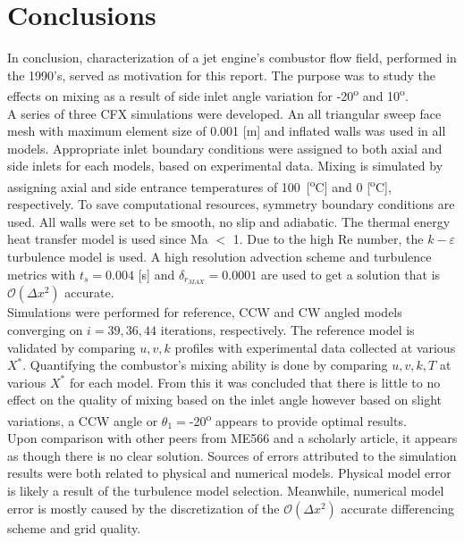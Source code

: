 \chapter{Conclusions}
\label{ch:conc}

In conclusion, characterization of a jet engine's combustor flow field, performed in the 1990's, served as motivation for this report. The purpose was to study the effects on mixing as a result of side inlet angle variation for -20\textsuperscript{o} and 10\textsuperscript{o}.\\

A series of three CFX simulations were developed. An all triangular sweep face mesh with maximum element size of 0.001 [m] and inflated walls was used in all models. Appropriate inlet boundary conditions were assigned to both axial and side inlets for each models, based on experimental data. Mixing is simulated by assigning  axial and side entrance temperatures of 100~[\textsuperscript{o}C] and 0 [\textsuperscript{o}C], respectively. To save computational resources, symmetry boundary conditions are used. All walls were set to be smooth, no slip and adiabatic. The thermal energy heat transfer model is used since Ma $<$ 1. Due to the high Re number, the $k-\varepsilon$ turbulence model is used. A high resolution advection scheme and turbulence metrics with $t_s = 0.004$ [s] and $\delta_{r_{MAX}}=0.0001$ are used to get a solution that is $\mathcal{O}(\Delta x^2)$ accurate.\\

Simulations were performed for reference, CCW and CW angled models converging on $i= 39, 36, 44$ iterations, respectively. The reference model is validated by comparing $u,v,k$ profiles with experimental data collected at various $X^*$. Quantifying the combustor's mixing ability is done by comparing $u,v,k,T$ at various $X^*$ for each model. From this it was concluded that there is little to no effect on the quality of mixing based on the inlet angle however based on slight variations, a CCW angle or $\theta_1=$-20\textsuperscript{o} appears to provide optimal results.\\

Upon comparison with other peers from ME566 and a scholarly article, it appears as though there is no clear solution. Sources of errors attributed to the simulation results were both related to physical and numerical models. Physical model error is likely a result of the turbulence model selection. Meanwhile, numerical model error is mostly caused by the discretization of the $\mathcal{O}(\Delta x^2)$ accurate differencing scheme and grid quality.\\
